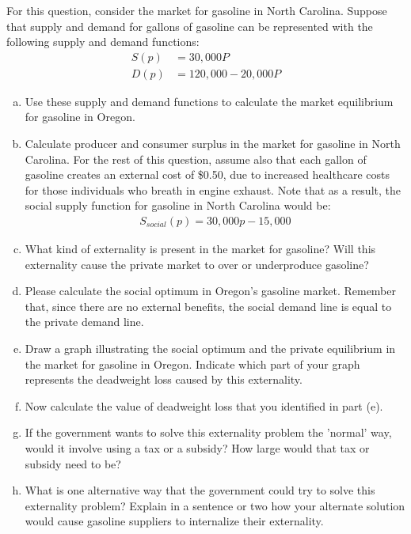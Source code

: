 \documentclass{article}
\begin{document}
\pagebreak

For this question, consider the market for gasoline in North Carolina. Suppose that supply and demand for gallons of gasoline can be represented with the following supply and demand functions:
\begin{align*}
    S(p) &= 30,000P\\
    D(p) &= 120,000 - 20,000P
\end{align*}

\begin{enumerate}[(a)]
    \item Use these supply and demand functions to calculate the market     equilibrium for gasoline in Oregon.
    \item Calculate producer and consumer surplus in the market for gasoline in North Carolina. For the rest of this question, assume also that each gallon of gasoline creates an external cost of \$0.50, due to increased healthcare     costs for those individuals who breath in engine exhaust. Note that as a result, the social supply function for gasoline in North Carolina would be:
    \begin{align*}
        S_{social}(p) = 30,000p - 15,000
    \end{align*}
    \item What kind of externality is present in the market for gasoline? Will this externality cause the private market to over or underproduce gasoline?
    \item Please calculate the social optimum in Oregon's gasoline market. Remember that, since there are no external benefits, the social demand line is equal to the private demand line.
    \item Draw a graph illustrating the social optimum and the private equilibrium in the market for gasoline in Oregon. Indicate which part of your graph represents the deadweight loss caused by this externality.
    \item Now calculate the value of deadweight loss that you identified in part (e).
    \item If the government wants to solve this externality problem the 'normal' way, would it involve using a tax or a subsidy? How large would that tax or subsidy need to be?
    \item What is one alternative way that the government could try to solve this externality problem? Explain in a sentence or two how your alternate solution would cause gasoline suppliers to internalize their externality.

\end{enumerate}
\end{document}
